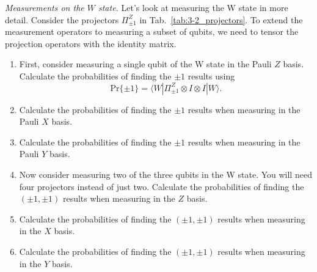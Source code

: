 \begin{exercise}
\emph{Measurements on the $W$ state.} Let's look at measuring the W state in more detail. Consider the projectors $\Pi_{\pm 1}^Z$ in Tab.~\ref{tab:3-2_projectors}. To extend the measurement operators to measuring a subset of qubits, we need to tensor the projection operators with the identity matrix.
\begin{enumerate}[label=(\alph*)]
    \item First, consider measuring a single qubit of the W state in the Pauli $Z$ basis. Calculate the probabilities of finding the $\pm1$ results using
    \begin{equation*}
        \text{Pr} \{\pm 1\} = \langle W | \Pi_{\pm 1}^Z \otimes I \otimes I | W \rangle.
    \end{equation*}
    \item Calculate the probabilities of finding the $\pm1$ results when measuring in the Pauli $X$ basis.
    \item Calculate the probabilities of finding the $\pm1$ results when measuring in the Pauli $Y$ basis.
    \item Now consider measuring two of the three qubits in the W state. You will need four projectors instead of just two. Calculate the probabilities of finding the $(\pm1,\pm1)$ results when measuring in the $Z$ basis.
    \item Calculate the probabilities of finding the $(\pm1,\pm1)$ results when measuring in the $X$ basis.
    \item Calculate the probabilities of finding the $(\pm1,\pm1)$ results when measuring in the $Y$ basis.
\end{enumerate}
\end{exercise}
